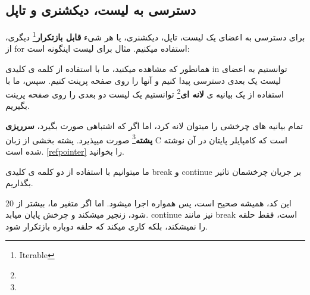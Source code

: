 \documentclass[14pt,a4paper]{memoir}
\begin{document}
	 
\subsection{دسترسی به لیست، دیکشنری و تاپل}\label{iter}
	 
	 برای دسترسی به اعضای یک لیست، تاپل، دیکشنری، یا هر شیء \textbf{قابل بازتکرار}\footnote{Iterable} دیگری، از for استفاده میکنیم. مثال برای لیست اینگونه است:
	 
	 \begin{latin}
	 	
	 \end{latin}
	 
	 
	 
	 
	 همانطور که مشاهده میکنید، ما با استفاده از کلمه ی کلیدی in توانستیم به اعضای لیست یک بعدی  دسترسی پیدا کنیم و آنها را روی صفحه پرینت کنیم. سپس، ما با استفاده از یک بیانیه ی \textbf{لانه ای}\footnote{} توانستیم یک لیست دو بعدی را روی صفحه پرینت بگیریم.
	 
	 \begin{tip}
	 	تمام بیانیه های چرخشی را میتوان لانه کرد، اما اگر که اشتباهی صورت بگیرد، \textbf{سرریزی پشته}\footnote{} صورت میپذیرد. پشته بخشی از زبان C است که کامپایلر پایتان در آن نوشته شده است.  \ref*{refpointer} را بخوانید.
	 \end{tip}
	 
	 
	 ما میتوانیم با استفاده از دو کلمه ی کلیدی break و continue بر جریان چرخشمان تاثیر بگذاریم.
	 
	 

		 	 \begin{latin}
			
		\end{latin}

	 
	 
	 این کد، همیشه صحیح است، پس همواره اجرا میشود. اما اگر متغیر ما، بیشتر از 20 شود، زنجیر میشکند و چرخش پایان میابد. continue نیز مانند break است، فقط حلقه را نمیشکند، بلکه کاری میکند که حلقه دوباره بازتکرار شود.
	 
\end{document}
